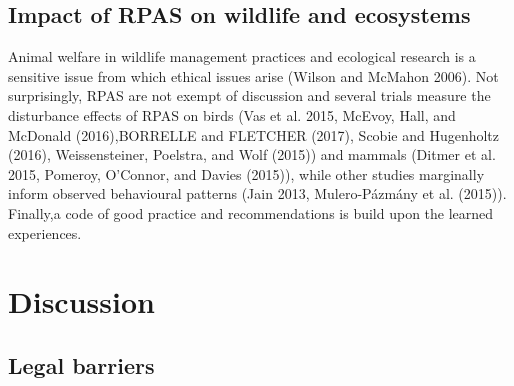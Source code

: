 \documentclass[]{interact}
\theoremstyle{plain}%
\theoremstyle{definition}
\theoremstyle{remark}
\begin{document}
\subsection{Impact of RPAS on wildlife and
ecosystems}\label{impact-of-rpas-on-wildlife-and-ecosystems}

Animal welfare in wildlife management practices and ecological research
is a sensitive issue from which ethical issues arise (Wilson and McMahon
2006). Not surprisingly, RPAS are not exempt of discussion and several
trials measure the disturbance effects of RPAS on birds (Vas et al.
2015, McEvoy, Hall, and McDonald (2016),BORRELLE and FLETCHER (2017),
Scobie and Hugenholtz (2016), Weissensteiner, Poelstra, and Wolf (2015))
and mammals (Ditmer et al. 2015, Pomeroy, O'Connor, and Davies (2015)),
while other studies marginally inform observed behavioural patterns
(Jain 2013, Mulero-Pázmány et al. (2015)). Finally,a code of good
practice and recommendations is build upon the learned experiences.

\section{Discussion}\label{discussion}

\subsection{Legal barriers}\label{legal-barriers}
\end{document}
